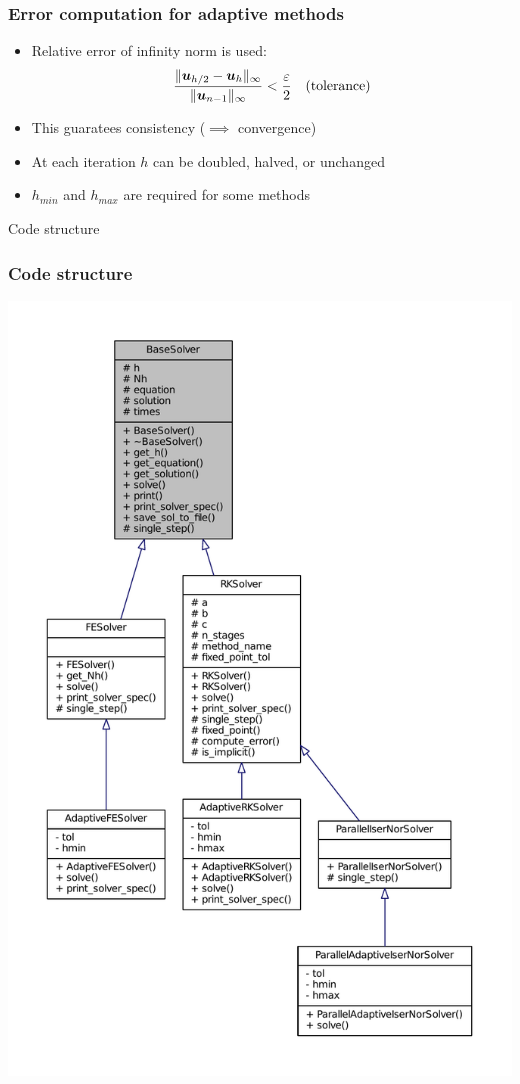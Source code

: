 \documentclass{beamer}
\begin{document}
\begin{frame} %
	\frametitle{Error computation for adaptive methods}
	\begin{itemize}
		\item Relative error of infinity norm is used:
		$$\frac{\lVert\boldsymbol u_{h/2}-\boldsymbol u_h\rVert_\infty}{\lVert\boldsymbol u_{n-1}\rVert_\infty} <
		\frac{\varepsilon}{2} \quad \text{(tolerance)}$$
		\item This guaratees consistency ($\implies$ convergence)
		\item At each iteration $h$ can be doubled, halved, or unchanged
		\item $h_{min}$ and $h_{max}$ are required for some methods
	\end{itemize}
\end{frame}


\begin{frame}[c] %
\begin{center}
	\Huge \color{blue} Code structure
\end{center}
\end{frame}


\begin{frame} %
	\frametitle{Code structure}
	\begin{center}
		\includegraphics[width=0.45 \linewidth]{etc/classes_full.pdf}
	\end{center}
\end{frame}
\end{document}

